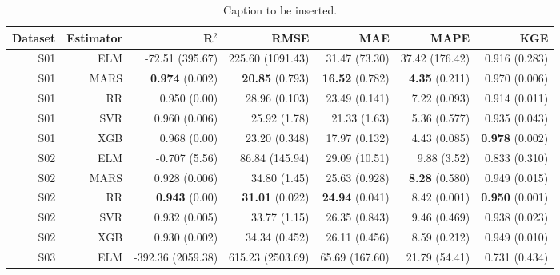 \begin{table}
\centering
\caption{Caption to be inserted.}
\label{eml___comparison_datasets_table}
\begin{tabular}{rrrrrrr}
\toprule
Dataset & Estimator &                               R$^2$ &                      RMSE &                     MAE &                    MAPE &                   KGE \\
\midrule
    S01 &       ELM &                     -72.51 (395.67) &          225.60 (1091.43) &           31.47 (73.30) &          37.42 (176.42) &         0.916 (0.283) \\
    S01 &      MARS &                { \bf 0.974} (0.002) &      { \bf 20.85} (0.793) &    { \bf 16.52} (0.782) &     { \bf 4.35} (0.211) &         0.970 (0.006) \\
    S01 &        RR &                        0.950 (0.00) &             28.96 (0.103) &           23.49 (0.141) &            7.22 (0.093) &         0.914 (0.011) \\
    S01 &       SVR &                       0.960 (0.006) &              25.92 (1.78) &            21.33 (1.63) &            5.36 (0.577) &         0.935 (0.043) \\
    S01 &       XGB &                        0.968 (0.00) &             23.20 (0.348) &           17.97 (0.132) &            4.43 (0.085) &  { \bf 0.978} (0.002) \\
    S02 &       ELM &                       -0.707 (5.56) &            86.84 (145.94) &           29.09 (10.51) &             9.88 (3.52) &         0.833 (0.310) \\
    S02 &      MARS &                       0.928 (0.006) &              34.80 (1.45) &           25.63 (0.928) &     { \bf 8.28} (0.580) &         0.949 (0.015) \\
    S02 &        RR &                 { \bf 0.943} (0.00) &      { \bf 31.01} (0.022) &    { \bf 24.94} (0.041) &            8.42 (0.001) &  { \bf 0.950} (0.001) \\
    S02 &       SVR &                       0.932 (0.005) &              33.77 (1.15) &           26.35 (0.843) &            9.46 (0.469) &         0.938 (0.023) \\
    S02 &       XGB &                       0.930 (0.002) &             34.34 (0.452) &           26.11 (0.456) &            8.59 (0.212) &         0.949 (0.010) \\
    S03 &       ELM &                   -392.36 (2059.38) &          615.23 (2503.69) &          65.69 (167.60) &           21.79 (54.41) &         0.731 (0.434) \\

\end{tabular}
\end{table}
